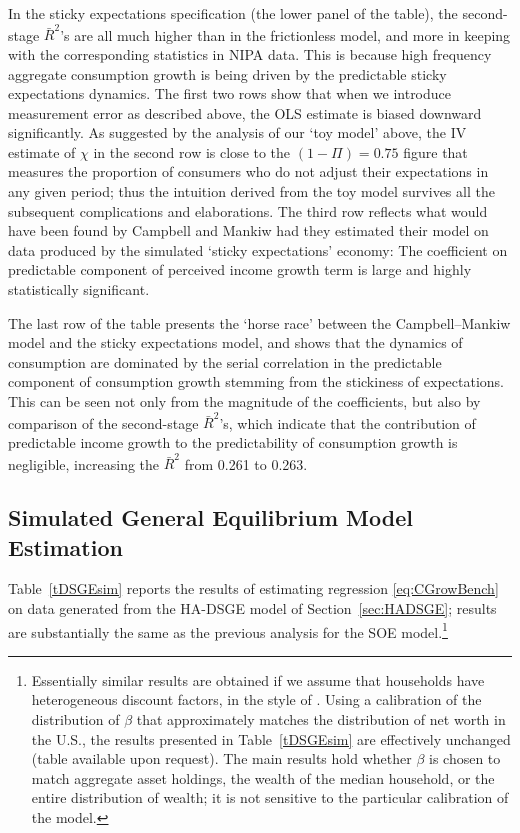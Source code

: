 \documentclass[titlepage]{\econtex}\newcommand{\texname}{cAndCwithStickyE}
\begin{document}
In the sticky expectations specification (the lower panel of the table), the second-stage $\bar{R}^{2}$'s are all much higher than in the frictionless model, and more in keeping with the corresponding statistics in NIPA data. This is because high frequency aggregate consumption growth is being driven by the predictable sticky expectations dynamics. The first two rows show that when we introduce measurement error as described above, the OLS estimate is biased downward significantly. As suggested by the analysis of our `toy model' above, the IV estimate of $\chi$ in the second row is close to the $(1-\Pi)=0.75$ figure that measures the proportion of consumers who do not adjust their expectations in any given period; thus the intuition derived from the toy model survives all the subsequent complications and elaborations. The third row reflects what would have been found by Campbell and Mankiw had they estimated their model on data produced by the simulated `sticky expectations' economy:  The coefficient on predictable component of perceived income growth term is large and highly statistically significant.

The last row of the table presents the `horse race' between the Campbell--Mankiw model and the sticky expectations model, and shows that the dynamics of consumption are dominated by the serial correlation in the predictable component of consumption growth stemming from the stickiness of expectations.  This can be seen not only from the magnitude of the coefficients, but also by comparison of the second-stage $\bar{R}^{2}$'s, which indicate that the contribution of predictable income growth to the predictability of consumption growth is negligible, increasing the $\bar{R}^2$ from 0.261 to 0.263.


\subsection{Simulated General Equilibrium Model Estimation}

Table~\ref{tDSGEsim} reports the results of estimating regression \eqref{eq:CGrowBench} on data generated from the HA-DSGE model of Section~\ref{sec:HADSGE}; results are substantially the same as the previous analysis for the SOE model.\footnote{Essentially similar results are obtained if we assume that households have heterogeneous discount factors, in the style of \cite{cstwMPC}.  Using a calibration of the distribution of $\beta$ that approximately matches the distribution of net worth in the U.S., the results presented in Table~\ref{tDSGEsim} are effectively unchanged (table available upon request).  The main results hold whether $\beta$ is chosen to match aggregate asset holdings, the wealth of the median household, or the entire distribution of wealth; it is not sensitive to the particular calibration of the model.}
\end{document}

